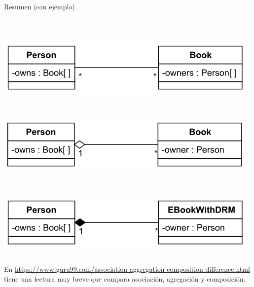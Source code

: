 \documentclass[10pt,envcountsect,spanish]{beamer}
\begin{document}
\begin{frame}{Resumen (con ejemplo)}
\begin{columns}
\begin{column}{.38\textwidth}
\

\centerline{\includegraphics[width=\textwidth]{fig/bidirectional}}

\

\centerline{\includegraphics[width=\textwidth]{fig/aggregation}}

\

\centerline{\includegraphics[width=\textwidth]{fig/composition}}

\end{column}
\end{columns}

\tiny
En \url{https://www.guru99.com/association-aggregation-composition-difference.html} tiene una lectura muy breve que compara asociación, agregación y composición.
\end{frame}
\end{document}
